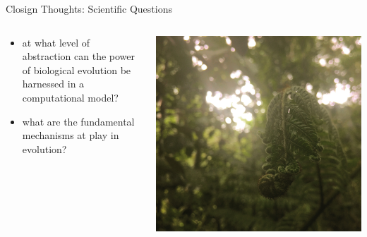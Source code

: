 \begin{frame}{Closign Thoughts: Scientific Questions}
\begin{columns}
\begin{column}{0.6\textwidth}
\begin{itemize}
\item at what level of abstraction can the power of biological evolution be harnessed in a computational model?
\item what are the fundamental mechanisms at play in evolution?
\end{itemize}
\end{column}
\begin{column}{0.4\textwidth}
\begin{center}
\includegraphics[width=\textwidth,trim={18cm 0 27cm 0},clip]{img/tropical_fern}
\end{center}
\end{column}
\end{columns}
\end{frame}

